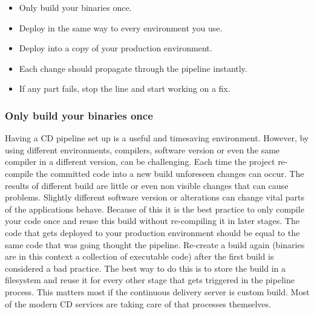 \begin{itemize}
  \item Only build your binaries once.
  \item Deploy in the same way to every environment you use.
  \item Deploy into a copy of your production environment.
  \item Each change should propagate through the pipeline instantly.
  \item If any part fails, stop the line and start working on a fix.
\end{itemize} \cite{humble2010continuous}

\subsubsection{Only build your binaries once}
Having a CD pipeline set up is a useful and timesaving environment. However, by using different environments, compilers, software version or even the same
compiler in a different version, can be challenging. Each time the project re-compile the committed code into a new build unforeseen changes can occur.
The results of different build are little or even non visible changes that can cause problems. Slightly different software version or alterations can change
vital parts of the applications behave. Because of this it is the best practice to only compile your
code once and reuse this build without re-compiling it in later stages. The code that gets deployed to your production environment should be equal to the same
code that was going thought the pipeline. Re-create a build again (binaries are in this context a collection of executable code) after the first
build is considered a bad practice. The best way to do this is to store the build in a filesystem and reuse it for every other stage that gets triggered in the
pipeline process. This matters most if the continuous delivery server is custom build. Most of the modern CD services are taking care of that processes
themselves.

